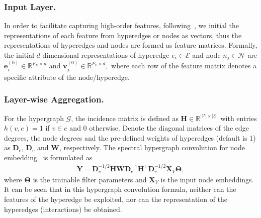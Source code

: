 \documentclass[11pt]{article}
\begin{document}
\subsubsection{Input Layer. }
In order to facilitate capturing high-order features, following~\cite{song_autoint_2019}, we initial the representations of each feature from hyperedges or nodes as vectors, thus the representations of hyperedges and nodes are formed as feature matrices. Formally, the initial $d$-dimensional representations of hyperedge $ e_i \in \mathcal{E} $ and node $ n_j \in \mathcal{N}$ are
$
\boldsymbol e_i^{(0)} \in \mathbb{R}^{F_E \times d}  $ and $  \boldsymbol v_j^{(0)} \in \mathbb{R}^{F_V \times d} ,
$
where each row of the feature matrix denotes a specific attribute of the node/hyperedge.

\subsubsection{Layer-wise Aggregation. }
For the hypergraph $\mathcal{G}$, the incidence matrix is defined as $\boldsymbol{H} \in \mathbb{R}^{|\mathcal{V}| \times|\mathcal{E}|}$ with entries $h(v, e)=1$ if $v \in e$ and 0 otherwise. Denote the diagonal matrices of the edge degrees, the node degrees and the pre-defined weights of hyperedges (default is 1) as $ \boldsymbol{D}_{e} $, $ \boldsymbol{D}_{v} $ and $ \boldsymbol{W} $, respectively. The spectral hypergraph convolution for node embedding~\cite{feng_hypergraph_2019,hu_adaptive_2021} is formulated as
\begin{align}
	\boldsymbol{Y}=\boldsymbol{D}_{v}^{-1/2} \boldsymbol{H} \boldsymbol{W} \boldsymbol{D}_{e}^{-1} \boldsymbol{H}^{\top} \boldsymbol{D}_{v}^{-1/2} \boldsymbol{X}_V \boldsymbol{\Theta},
\end{align}
where $ \boldsymbol{\Theta} $ is the trainable filter parameters and $ \boldsymbol{X}_V $ is the input node embeddings. It can be seen that in this hypergraph convolution formula, neither can the features of the hyperedge be exploited, nor can the representation of the hyperedges (interactions) be obtained.
\end{document}
